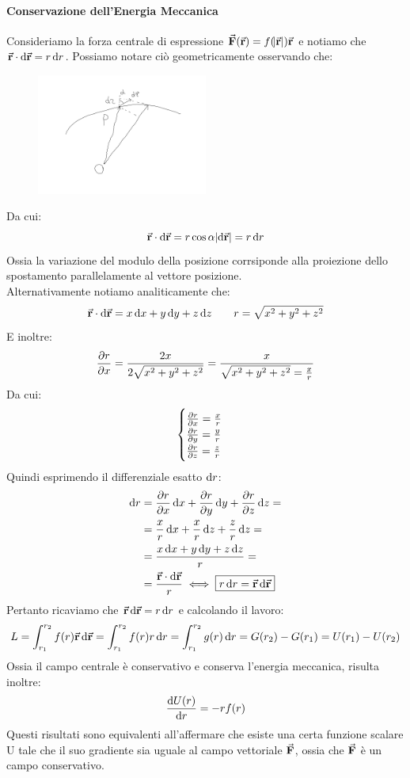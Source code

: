 \documentclass{report}
\newcommand{\note}{\noindent {\quad \bf \underline{Osservazione:}} \quad}
\renewcommand{\r}{\va{r}}
\newcommand{\F}{\va{F}}
\begin{document}
\paragraph{Conservazione dell'Energia Meccanica}
Consideriamo la forza centrale di espressione $\F(\r)=f(\abs{\r})\r$ e notiamo che $\r\cdot\dif\r=r\dif r$. Possiamo notare ciò geometricamente osservando che:
\begin{figure}[H]
    \centering
    \includegraphics[width=0.5\textwidth]{EnergiaCampiCentrali.png}
\end{figure}
Da cui:
\[\r\cdot\dif\r=r\cos\alpha\abs{\dif\r}=r\dif r\]
Ossia la variazione del modulo della posizione corrsiponde alla proiezione dello spostamento parallelamente al vettore posizione.\\
Alternativamente notiamo analiticamente che:
\[\r\cdot\dif\r=x\dif x+y\dif y+z\dif z\quad\quad r=\sqrt{x^2+y^2+z^2}\]
E inoltre:
\begin{equation}
    \pdv{r}{x}=\frac{2x}{2\sqrt{x^2+y^2+z^2}}=\frac{x}{\sqrt{x^2+y^2+z^2}=\frac{x}{r}}
\end{equation}
Da cui:
\begin{equation}
\begin{cases}
    \pdv{r}{x}=\frac{x}{r}\\
    \pdv{r}{y}=\frac{y}{r}\\
    \pdv{r}{z}=\frac{z}{r}
\end{cases}
\end{equation}
Quindi esprimendo il differenziale esatto $\dif r$:
\begin{equation}
\begin{split}
    \dif r&=\pdv{r}{x}\dif x+\pdv{r}{y}\dif y+\pdv{r}{z}\dif z=\\
    &=\frac{x}{r}\dif x+\frac{x}{r}\dif z+\frac{z}{r}\dif z=\\
    &=\frac{x\dif x+y\dif y+z\dif z}{r}=\\
    &=\frac{\r\cdot\dif\r}{r}\iff \boxed{r\dif r=\r\dif\r}
\end{split}
\end{equation}
Pertanto ricaviamo che $\r\dif\r=r\dif r$ e calcolando il lavoro:
\[L=\int_{r_1}^{r_2}f(r)\r\dif\r=\int_{r_1}^{r_2}f(r) r\dif r=\int_{r_1}^{r_2}g(r)\dif r=G(r_2)-G(r_1)=U(r_1)-U(r_2)\]
Ossia il campo centrale è conservativo e conserva l'energia meccanica, risulta inoltre:
\[\dv{U(r)}{r}=-rf(r)\]
\note Questi risultati sono equivalenti all'affermare che esiste una certa funzione scalare U tale che il suo gradiente sia uguale al campo vettoriale $\F$, ossia che $\F$ è un campo conservativo.
\end{document}
